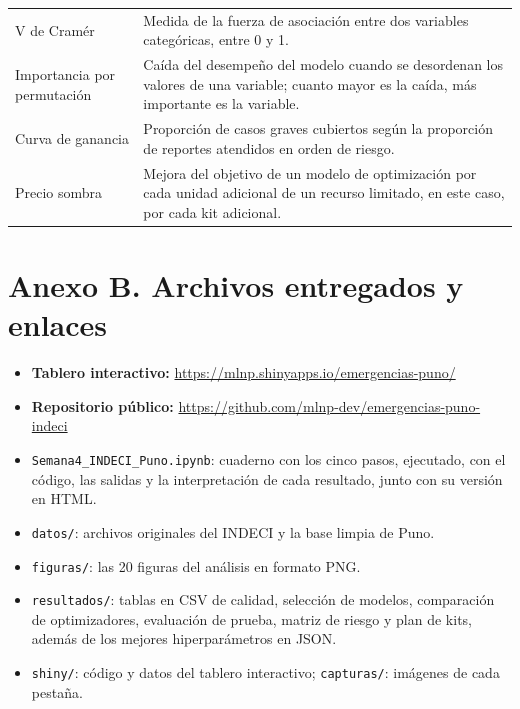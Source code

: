 \documentclass[12pt,a4paper]{article}
\begin{document}
\begin{table}[H]
\begin{tabularx}{\textwidth}{L{3.6cm}Y}
V de Cramér & Medida de la fuerza de asociación entre dos variables categóricas, entre 0 y 1. \\
Importancia por permutación & Caída del desempeño del modelo cuando se desordenan los valores de una variable;
cuanto mayor es la caída, más importante es la variable. \\
Curva de ganancia & Proporción de casos graves cubiertos según la proporción de reportes atendidos en orden de riesgo. \\
Precio sombra & Mejora del objetivo de un modelo de optimización por cada unidad adicional de un recurso limitado,
en este caso, por cada kit adicional. \\
\bottomrule
\end{tabularx}
\end{table}

\section*{Anexo B. Archivos entregados y enlaces}

\begin{itemize}
\item \textbf{Tablero interactivo:} \url{https://mlnp.shinyapps.io/emergencias-puno/}
\item \textbf{Repositorio público:} \url{https://github.com/mlnp-dev/emergencias-puno-indeci}
\item \texttt{Semana4\_INDECI\_Puno.ipynb}: cuaderno con los cinco pasos, ejecutado, con el código, las salidas y la
interpretación de cada resultado, junto con su versión en HTML.
\item \texttt{datos/}: archivos originales del INDECI y la base limpia de Puno.
\item \texttt{figuras/}: las 20 figuras del análisis en formato PNG.
\item \texttt{resultados/}: tablas en CSV de calidad, selección de modelos, comparación de optimizadores, evaluación de
prueba, matriz de riesgo y plan de kits, además de los mejores hiperparámetros en JSON.
\item \texttt{shiny/}: código y datos del tablero interactivo; \texttt{capturas/}: imágenes de cada pestaña.
\end{itemize}
\end{document}
